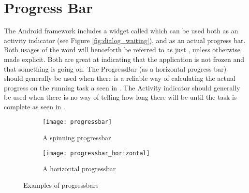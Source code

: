 
\chapter{Progress Bar}
\label{cha:progress_bar}

The Android framework includes a widget called  which can be used both as an activity indicator (see Figure \ref{fig:dialog_waiting}), and as an actual progress bar. Both usages of the word will henceforth be referred to as just , unless otherwise made explicit. Both are great at indicating that the application is not frozen and that something is going on. The ProgressBar (as a horizontal progress bar) should generally be used when there is a reliable way of calculating the actual progress on the running task a seen in . The Activity indicator should generally be used when there is no way of telling how long there will be until the task is complete as seen in .

\begin{figure}[!htbp]
    \centering
    \begin{subfigure}[t]{0.4\textwidth}
        \centering
        \texttt{[image: progressbar]}
    \caption{A spinning progressbar}
    \label{fig:spinning_progressbar}
    \end{subfigure}
    \hspace{5em} 
    \begin{subfigure}[t]{0.4\textwidth}
        \centering
        \texttt{[image: progressbar\_horizontal]}
    \caption{A horizontal progressbar}
    \label{fig:horizontal_progressbar}
    \end{subfigure}
    
    \caption{Examples of progressbars}
    \label{fig:progressbars}
\end{figure}
